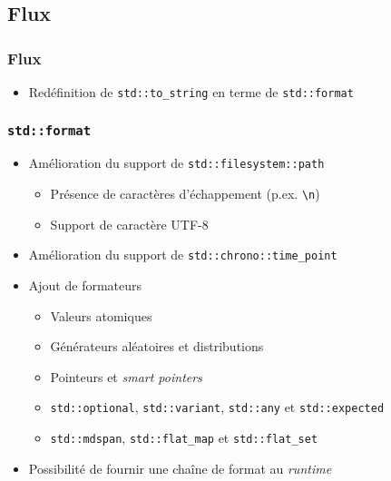\documentclass[C++.tex]{subfiles}
\begin{document}
\subsection*{Flux}
\begin{frame}[fragile]
	\frametitle{Flux}
	\begin{itemize}
		\item Redéfinition de \lstinline|std::to_string| en terme de \lstinline|std::format|
	\end{itemize}
\end{frame}

\begin{frame}[fragile]
	\frametitle{\lstinline|std::format|}
	\begin{itemize}
		\item Amélioration du support de \lstinline|std::filesystem::path|
		\begin{itemize}
			\item Présence de caractères d'échappement (p.ex. \lstinline|\n|)
			\item Support de caractère UTF-8
		\end{itemize}
		\item Amélioration du support de \lstinline|std::chrono::time_point|
		\item Ajout de formateurs
		\begin{itemize}
			\item Valeurs atomiques
			\item Générateurs aléatoires et distributions
			\item Pointeurs et \textit{smart pointers}
			\item \lstinline|std::optional|, \lstinline|std::variant|, \lstinline|std::any| et \lstinline|std::expected|
			\item \lstinline|std::mdspan|, \lstinline|std::flat_map| et \lstinline|std::flat_set|
		\end{itemize}
		\item Possibilité de fournir une chaîne de format au \textit{runtime}
	\end{itemize}
\end{frame}
\end{document}
